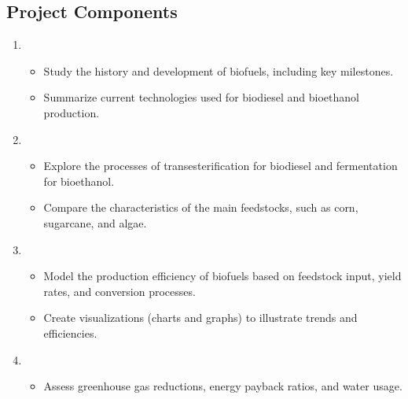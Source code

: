 \documentclass[letterpaper,10pt,english]{jupyterBook}
\begin{document}
\subsection{Project Components}
\label{\detokenize{ProjectInstructions:id42}}\begin{enumerate}
%
\item {} 
\sphinxAtStartPar
{}
\begin{itemize}
\item {} 
\sphinxAtStartPar
Study the history and development of biofuels, including key milestones.

\item {} 
\sphinxAtStartPar
Summarize current technologies used for biodiesel and bioethanol production.

\end{itemize}

\item {} 
\sphinxAtStartPar
{}
\begin{itemize}
\item {} 
\sphinxAtStartPar
Explore the processes of transesterification for biodiesel and fermentation for bioethanol.

\item {} 
\sphinxAtStartPar
Compare the characteristics of the main feedstocks, such as corn, sugarcane, and algae.

\end{itemize}

\item {} 
\sphinxAtStartPar
{}
\begin{itemize}
\item {} 
\sphinxAtStartPar
Model the production efficiency of biofuels based on feedstock input, yield rates, and conversion processes.

\item {} 
\sphinxAtStartPar
Create visualizations (charts and graphs) to illustrate trends and efficiencies.

\end{itemize}

\item {} 
\sphinxAtStartPar
{}
\begin{itemize}
\item {} 
\sphinxAtStartPar
Assess greenhouse gas reductions, energy payback ratios, and water usage.


\end{itemize}
\end{enumerate}
\end{document}
